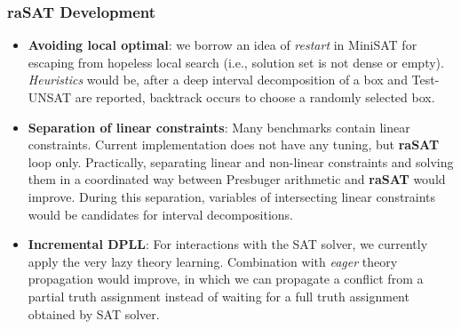 {\subsubsection{\textbf{raSAT} Development}

\begin{itemize}
\item \textbf{Avoiding local optimal}: 
we borrow an idea of \emph{restart} in MiniSAT for escaping from hopeless local search 
(i.e., solution set is not dense or empty). 
\emph{Heuristics} would be, after a deep interval decomposition of 
a box and Test-UNSAT are reported, backtrack occurs to choose a randomly selected box. 

\item \textbf{Separation of linear constraints}: 
Many benchmarks contain linear constraints. Current implementation does not have 
any tuning, but {\bf raSAT} loop only. 
Practically, separating linear and non-linear constraints and solving them 
in a coordinated way between Presbuger arithmetic and {\bf raSAT} would improve. 
During this separation, variables of intersecting linear constraints would be candidates 
for interval decompositions. 

\item \textbf{Incremental DPLL}: For interactions with the SAT solver, 
we currently apply the very lazy theory learning. Combination with 
\emph{eager} theory propagation would improve, in which we can propagate 
a conflict from a partial truth assignment instead of waiting 
for a full truth assignment obtained by SAT solver.
\end{itemize}
}

